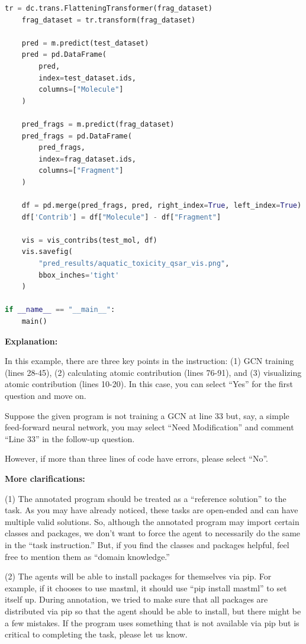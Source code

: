 \begin{lstlisting}[language=Python]
    tr = dc.trans.FlatteningTransformer(frag_dataset)
    frag_dataset = tr.transform(frag_dataset)

    pred = m.predict(test_dataset)
    pred = pd.DataFrame(
        pred, 
        index=test_dataset.ids, 
        columns=["Molecule"]
    )

    pred_frags = m.predict(frag_dataset)
    pred_frags = pd.DataFrame(
        pred_frags, 
        index=frag_dataset.ids, 
        columns=["Fragment"]
    )

    df = pd.merge(pred_frags, pred, right_index=True, left_index=True)
    df['Contrib'] = df["Molecule"] - df["Fragment"]

    vis = vis_contribs(test_mol, df)
    vis.savefig(
        "pred_results/aquatic_toxicity_qsar_vis.png", 
        bbox_inches='tight'
    )

if __name__ == "__main__":
    main()
\end{lstlisting}

\begin{tcolorbox}
\small
\textbf{Explanation:}

In this example, there are three key points in the instruction: (1) GCN training (lines 28-45), (2) calculating atomic contribution (lines 76-91), and (3) visualizing atomic contribution (lines 10-20). In this case, you can select “Yes” for the first question and move on.

Suppose the given program is not training a GCN at line 33 but, say, a simple feed-forward neural network, you may select “Need Modification” and comment “Line 33” in the follow-up question.

However, if more than three lines of code have errors, please select “No”.

\textbf{More clarifications:}

(1) The annotated program should be treated as a ``reference solution'' to the task. As you may have already noticed, these tasks are open-ended and can have multiple valid solutions. So, although the annotated program may import certain classes and packages, we don't want to force the agent to necessarily do the same in the ``task instruction.'' But, if you find the classes and packages helpful, feel free to mention them as ``domain knowledge.''

(2) The agents will be able to install packages for themselves via pip. For example, if it chooses to use mastml, it should use ``pip install mastml'' to set itself up. During annotation, we tried to make sure that all packages are distributed via pip so that the agent should be able to install, but there might be a few mistakes. If the program uses something that is not available via pip but is critical to completing the task, please let us know.
\end{tcolorbox}